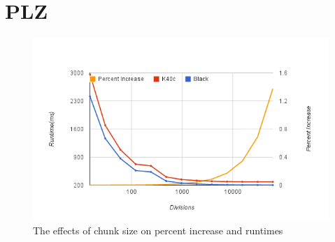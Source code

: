 \section{PLZ}
\begin{figure}[ht!]
\centering
\includegraphics[width=1.0\textwidth]{images/lzchart.png}
\caption{The effects of chunk size on percent increase and runtimes}
\label{fig:lzchart}
\end{figure}

